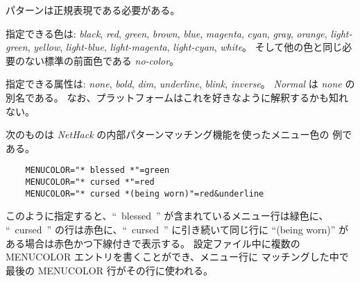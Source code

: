 パターンは正規表現である必要がある。

指定できる色は:
{\it black}, {\it red}, {\it green}, {\it brown},
{\it blue}, {\it magenta}, {\it cyan}, {\it gray}, {\it orange},
{\it light-green}, {\it yellow}, {\it light-blue}, {\it light-magenta},
{\it light-cyan}, {\it white}。
そして他の色と同じ必要のない標準の前面色である {\it no-color}。

指定できる属性は:
{\it none}, {\it bold}, {\it dim}, {\it underline},
{\it blink}, {\it inverse}。
{\it Normal\/} は {\it none} の別名である。
なお、プラットフォームはこれを好きなように解釈するかも知れない。

次のものは {\it NetHack \/} の内部パターンマッチング機能を使ったメニュー色の
例である。

\begin{verbatim}
    MENUCOLOR="* blessed *"=green
    MENUCOLOR="* cursed *"=red
    MENUCOLOR="* cursed *(being worn)"=red&underline
\end{verbatim}

このように指定すると、``~blessed~'' が含まれているメニュー行は緑色に、
``~cursed~'' の行は赤色に、``~cursed~'' に引き続いて同じ行に ``(being worn)'' が
ある場合は赤色かつ下線付きで表示する。
設定ファイル中に複数の MENUCOLOR エントリを書くことができ、メニュー行に
マッチングした中で最後の MENUCOLOR 行がその行に使われる。

